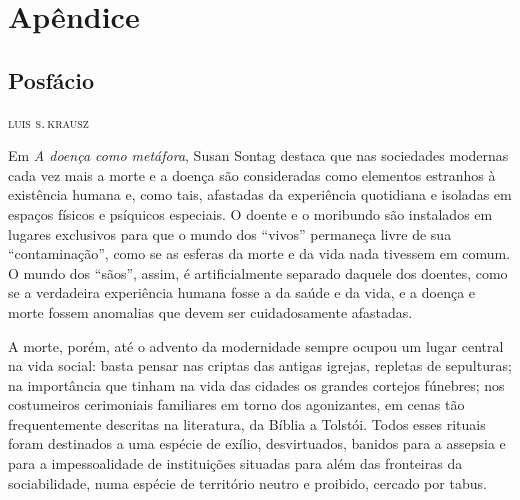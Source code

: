 \part{Apêndice}


\chapter*{Posfácio\smallskip{}}

\begin{flushright}
\textsc{luis s.\,krausz}
\end{flushright}

\noindent Em \emph{A doença como metáfora}, Susan Sontag destaca que nas
sociedades modernas cada vez mais a morte e a doença são consideradas
como elementos estranhos à existência humana e, como tais, afastadas da
experiência quotidiana e isoladas em espaços físicos e psíquicos
especiais. O doente e o moribundo são instalados em lugares exclusivos
para que o mundo dos ``vivos'' permaneça livre de sua ``contaminação'',
como se as esferas da morte e da vida nada tivessem em comum. O mundo
dos ``sãos'', assim, é artificialmente separado daquele dos doentes,
como se a verdadeira experiência humana fosse a da saúde e da vida, e a
doença e morte fossem anomalias que devem ser cuidadosamente afastadas.

A morte, porém, até o advento da modernidade sempre ocupou um lugar
central na vida social: basta pensar nas criptas das antigas igrejas,
repletas de sepulturas; na importância que tinham na vida das cidades os
grandes cortejos fúnebres; nos costumeiros cerimoniais familiares em
torno dos agonizantes, em cenas tão frequentemente descritas na
literatura, da Bíblia a Tolstói. Todos esses rituais foram destinados a
uma espécie de exílio, desvirtuados, banidos para a assepsia e para a
impessoalidade de instituições situadas para além das fronteiras da
sociabilidade, numa espécie de território neutro e proibido, cercado por
tabus.


